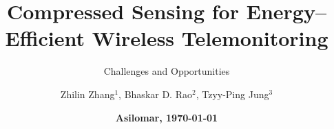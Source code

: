 \documentclass[notheorems,table]{beamer}
\begin{document}
\graphicspath{{figs/}}

\title{Compressed Sensing for Energy--Efficient Wireless Telemonitoring}
\subtitle{Challenges and Opportunities}
\author[zhilinzhang@ieee.org]{Zhilin Zhang$^1$, Bhaskar D. Rao$^2$, Tzyy-Ping Jung$^3$}
\date{\bf Asilomar, \today}
\subject{Asilomar 2013}


\begin{frame}
	\titlepage
\end{frame}


\end{document}
